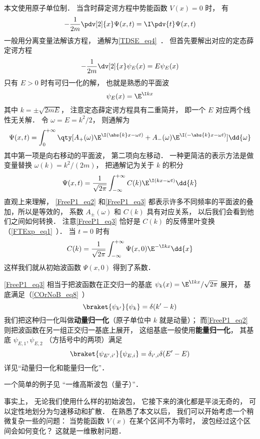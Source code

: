 
\begin{issues}
\issueTODO
\end{issues}


本文使用原子单位制． 当含时薛定谔方程中势能函数 $V(x) = 0$ 时， 有
\begin{equation}\label{FreeP1_eq1}
-\frac{1}{2m}\pdv[2]{x}\Psi(x,t) = \I \pdv{t} \Psi(x,t)
\end{equation}
一般用分离变量法解该方程， 通解为\autoref{TDSE_eq4}~． 但首先要解出对应的定态薛定谔方程
\begin{equation}
-\frac{1}{2m}\dv[2]{x}\psi_E(x) = E \psi_E(x)
\end{equation}
只有 $E > 0$ 时有可归一化的解， 也就是熟悉的平面波
\begin{equation}
\psi_E(x) = \E^{\I k x}
\end{equation}
其中 $k = \pm\sqrt{2mE}$， 注意定态薛定谔方程具有二重简并， 即一个 $E$ 对应两个线性无关解． 令 $\omega = E = k^2/2$， 则通解为
\begin{equation}\label{FreeP1_eq2}
\Psi(x,t) = \int_{0}^{+\infty} \qty[A_+(\omega) \E^{\I (\abs{k}x - \omega t)} + A_-(\omega) \E^{\I (-\abs{k}x - \omega t)}] \dd{\omega}
\end{equation}
其中第一项是向右移动的平面波， 第二项向左移动． 一种更简洁的表示方法是做变量替换 $\omega(k) = k^2/(2m)$， 把通解记为关于 $k$ 的积分
\begin{equation}\label{FreeP1_eq3}
\Psi(x,t) = \frac{1}{\sqrt{2\pi}} \int_{-\infty}^{+\infty} C(k) \E^{\I (k x - \omega t)} \dd{k}
\end{equation}
直观上来理解， \autoref{FreeP1_eq2} 和\autoref{FreeP1_eq3} 都表示许多不同频率的平面波的叠加，所以是等效的， 系数 $A_\pm(\omega)$ 和 $C(k)$ 具有对应关系， 以后我们会看到他们之间如何转换． 注意\autoref{FreeP1_eq3} 恰好是 $C(k)$ 的反傅里叶变换（\autoref{FTExp_eq1}~）． 当 $t = 0$ 时有
\begin{equation}
C(k) = \frac{1}{\sqrt{2\pi}} \int_{-\infty}^{+\infty} \Psi(x,0) \E^{-\I k x} \dd{x}
\end{equation}
这样我们就从初始波函数 $\Psi(x,0)$ 得到了系数．

\autoref{FreeP1_eq3} 相当于把波函数在正交归一的基底 $\psi_k(x) = \E^{\I kx}/\sqrt{2\pi}$ 展开， 基底满足（\autoref{COrNoB_eq8}~）
\begin{equation}
\braket{\psi_{k'}}{\psi_k} = \delta(k' - k)
\end{equation}
我们把这种归一化叫做\textbf{动量归一化}（原子单位中 $k$ 就是动量）； 而\autoref{FreeP1_eq2} 则把波函数在另一组正交归一基底上展开， 这组基底一般使用\textbf{能量归一化}， 其基底 $\psi_{E,1}, \psi_{E,2}$ （方括号中的两项）满足
\begin{equation}
\braket{\psi_{E',i'}}{\psi_{E,i}} = \delta_{i',i}\delta(E' - E)
\end{equation}
详见“动量归一化和能量归一化”．

一个简单的例子见 “一维高斯波包（量子）”．

事实上， 无论我们使用什么样的初始波包， 它接下来的演化都是平淡无奇的， 可以定性地划分为匀速移动和扩散． 在熟悉了本文以后， 我们可以开始考虑一个稍微复杂一些的问题： 当势能函数 $V(x)$ 在某个区间不为零时， 波包经过这个区间会如何变化？ 这就是一维散射问题．
